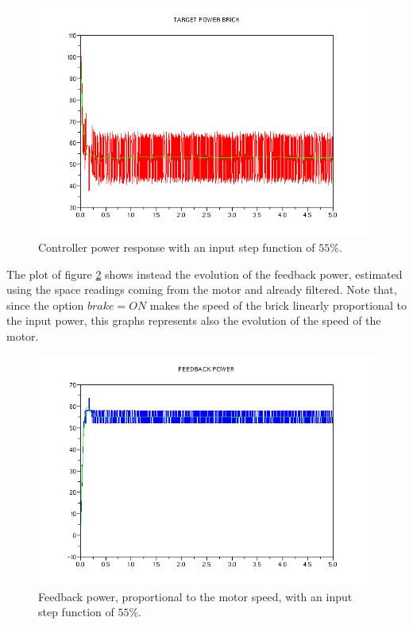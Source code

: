 \begin{figure}[htbp]
  \begin{center}
  \includegraphics[scale=0.5]{FIGURES_2/BRK-Step-TP.png}
    \caption[]{Controller power response with an input step function of $55\%$.}
    \label{fig:stepTargetPower}
  \end{center}
\end{figure}

The plot of figure \ref{fig:stepFeedbackPower} shows instead the evolution of the feedback power, estimated using the space readings coming from the motor and already filtered. Note that, since the option $brake = ON$ makes the speed of the brick linearly proportional to the input power, this graphs represents also the evolution of the speed of the motor.

\begin{figure}[htpb]
  \begin{center}
  \includegraphics[scale=0.5]{FIGURES_2/BRK-Step-FP.png}
    \caption[]{Feedback power, proportional to the motor speed, with an input step function of $55\%$.}
    \label{fig:stepFeedbackPower}
  \end{center}
\end{figure}

